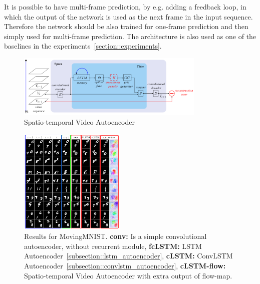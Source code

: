   It is possible to have multi-frame prediction, by e.g. adding a feedback loop, in which the output of the network is used as the next frame in the input 
  sequence. Therefore the network should be also trained for one-frame prediction and then simply used for multi-frame prediction. The architecture is also used
  as one of the baselines in the experiments~\ref{section::experiments}.
  \begin{figure}[H]
   \includegraphics[width=0.8\textwidth]{../Images/patraucean.png}
   \centering
   \caption{Spatio-temporal Video Autoencoder \cite{Patraucean2015}}
   \label{fig:spatiotemp_architecture}
  \end{figure}\noindent
  \begin{figure}[H]
   \includegraphics[width=0.45\textwidth]{../Images/patraucean_results_mnist.png}
   \centering
   \caption{Results for MovingMNIST. \textbf{conv:} Is a simple convolutional autoencoder, without recurrent module, \textbf{fcLSTM:} LSTM Autoencoder~\ref{subsection::lstm_autoencoder},
   \textbf{cLSTM:} ConvLSTM Autoencoder~\ref{subsection::convlstm_autoencoder}, \textbf{cLSTM-flow:} Spatio-temporal Video Autoencoder with extra output of flow-map. \cite{Patraucean2015}}
   \label{fig:spatiotemp_results}
  \end{figure}\noindent
 
